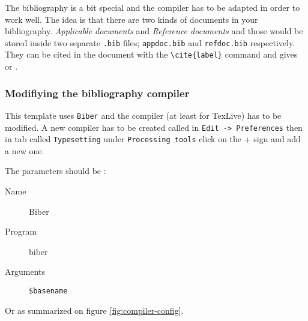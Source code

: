         The bibliography is a bit special and the compiler has to be adapted in order to work well. The idea is that there are two kinds of documents in your bibliography. \textit{Applicable documents} and \textit{Reference documents} and those would be stored inside two separate \texttt{.bib} files; \texttt{appdoc.bib} and \texttt{refdoc.bib} respectively. They can be cited in the document with the \verb'\cite{label}' command and gives \cite{Abedon1994} or \cite{AbedonHymanThomas2003}.

        \subsubsection{Modifiying the bibliography compiler}

            This template uses \texttt{Biber} and the compiler (at least for TexLive) has to be modified. A new compiler has to be created called in \texttt{Edit -> Preferences} then in tab called \texttt{Typesetting} under \texttt{Processing tools} click on the + sign and add a new one.

            The parameters should be :

            \begin{description}
                \item[Name] Biber
                \item[Program] biber
                \item[Arguments] \verb'$basename'
            \end{description}

            Or as summarized on figure \ref{fig:compiler-config}.




